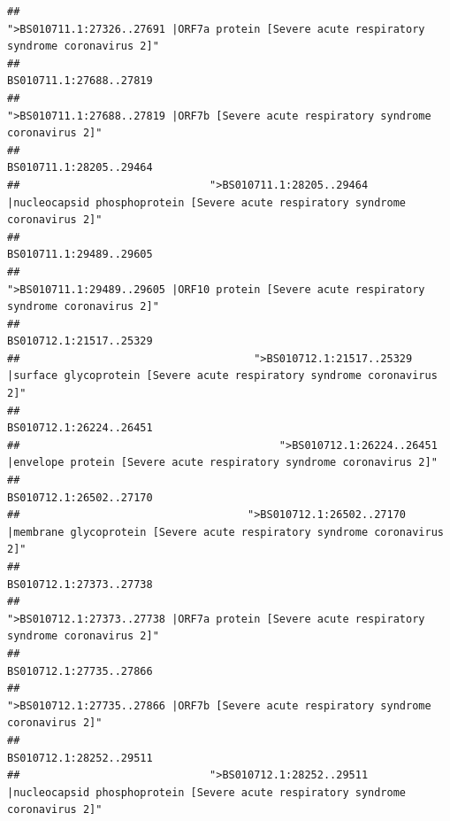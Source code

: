 \documentclass[
]{article}
\begin{document}
\begin{verbatim}
##                                            ">BS010711.1:27326..27691 |ORF7a protein [Severe acute respiratory syndrome coronavirus 2]" 
##                                                                                                                BS010711.1:27688..27819 
##                                                    ">BS010711.1:27688..27819 |ORF7b [Severe acute respiratory syndrome coronavirus 2]" 
##                                                                                                                BS010711.1:28205..29464 
##                              ">BS010711.1:28205..29464 |nucleocapsid phosphoprotein [Severe acute respiratory syndrome coronavirus 2]" 
##                                                                                                                BS010711.1:29489..29605 
##                                            ">BS010711.1:29489..29605 |ORF10 protein [Severe acute respiratory syndrome coronavirus 2]" 
##                                                                                                                BS010712.1:21517..25329 
##                                     ">BS010712.1:21517..25329 |surface glycoprotein [Severe acute respiratory syndrome coronavirus 2]" 
##                                                                                                                BS010712.1:26224..26451 
##                                         ">BS010712.1:26224..26451 |envelope protein [Severe acute respiratory syndrome coronavirus 2]" 
##                                                                                                                BS010712.1:26502..27170 
##                                    ">BS010712.1:26502..27170 |membrane glycoprotein [Severe acute respiratory syndrome coronavirus 2]" 
##                                                                                                                BS010712.1:27373..27738 
##                                            ">BS010712.1:27373..27738 |ORF7a protein [Severe acute respiratory syndrome coronavirus 2]" 
##                                                                                                                BS010712.1:27735..27866 
##                                                    ">BS010712.1:27735..27866 |ORF7b [Severe acute respiratory syndrome coronavirus 2]" 
##                                                                                                                BS010712.1:28252..29511 
##                              ">BS010712.1:28252..29511 |nucleocapsid phosphoprotein [Severe acute respiratory syndrome coronavirus 2]" 

\end{verbatim}
\end{document}
